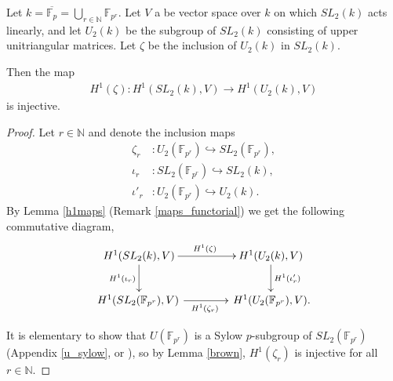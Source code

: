 \begin{example} \label{ab_example}
	Let $k = \overline{\mathbb{F}_p} = \bigcup_{r\in \mathbb{N}} \mathbb{F}_{p^r}$.
Let $V$ a be vector space over $k$ on which $SL_2(k)$ acts linearly, and let $U_2(k)$ be the subgroup of $SL_2(k)$ consisting of upper unitriangular matrices. Let $\zeta$ be the inclusion of $U_2(k)$ in $SL_2(k)$.

Then the map
	\begin{align}
		H^1(\zeta): H^1(SL_2(k), V) \rightarrow H^1(U_2(k), V)
	\end{align}
	is injective.
\label{eg:sl2ab}
\end{example}
\begin{proof}
	Let $r \in \mathbb{N}$ and denote the inclusion maps
\begin{align*}
	\zeta_r&:U_2(\mathbb{F}_{p^r}) \hookrightarrow SL_2(\mathbb{F}_{p^r}), \\
	\iota_r&:SL_2(\mathbb{F}_{p^r}) \hookrightarrow SL_2(k), \\
	\iota'_r&:U_2(\mathbb{F}_{p^r}) \hookrightarrow U_2(k).
\end{align*}
By Lemma \ref{h1maps} (Remark \ref{maps_functorial}) we get the following commutative diagram,
\begin{align}\label{eqn:cd}
	\xymatrix@C=40pt{
		H^1(SL_2(k), V) \ar[r]^{H^1(\zeta)} \ar[d]_{H^1(\iota_r)} & H^1(U_2(k), V) \ar[d]^{H^1(\iota'_r)} \\
		H^1(SL_2(\mathbb{F}_{p^r}), V)\, \ar[r]_{H^1(\zeta_r)} &\, H^1(U_2(\mathbb{F}_{p^r}), V).
	}
\end{align}

It is elementary to show that $U(\mathbb{F}_{p^r})$ is a Sylow $p$-subgroup of $SL_2(\mathbb{F}_{p^r})$ (Appendix \ref{u_sylow}, or \cite[TODO]{carter1989simple}), so by Lemma \ref{brown}, $H^1(\zeta_r)$ is injective for all $r \in \mathbb{N}$.


\end{proof}
